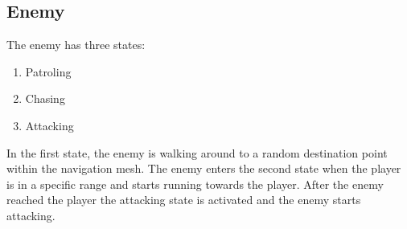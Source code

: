 \documentclass[a4paper,11pt,oneside]{scrreprt}
\begin{document}
\subsection{Enemy}
The enemy has three states:
\begin{enumerate}
\item Patroling
\item Chasing
\item Attacking
\end{enumerate}

In the first state, the enemy is walking around to a random destination point within the navigation mesh. The enemy enters the second state when the player is in a specific range and starts running towards the player. After the enemy reached the player the attacking state is activated and the enemy starts attacking.
\inputminted[fontsize=\footnotesize,linenos]{csharp}{code/Enemy.cs}


\clearpage
{}
{}
\listoffigures

\clearpage
{}
{}
\printbibliography
\end{document}
